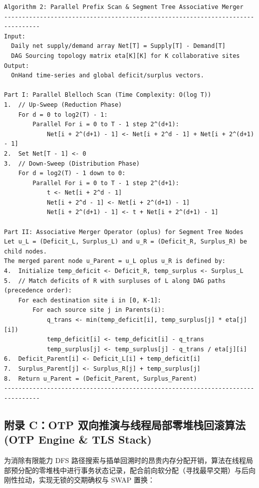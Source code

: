 \documentclass[11pt,a4paper]{article}
\begin{document}
\begin{verbatim}
Algorithm 2: Parallel Prefix Scan & Segment Tree Associative Merger
--------------------------------------------------------------------------------
Input:
  Daily net supply/demand array Net[T] = Supply[T] - Demand[T]
  DAG Sourcing topology matrix eta[K][K] for K collaborative sites
Output:
  OnHand time-series and global deficit/surplus vectors.

Part I: Parallel Blelloch Scan (Time Complexity: O(log T))
1.  // Up-Sweep (Reduction Phase)
    For d = 0 to log2(T) - 1:
        Parallel For i = 0 to T - 1 step 2^(d+1):
            Net[i + 2^(d+1) - 1] <- Net[i + 2^d - 1] + Net[i + 2^(d+1) - 1]
2.  Set Net[T - 1] <- 0
3.  // Down-Sweep (Distribution Phase)
    For d = log2(T) - 1 down to 0:
        Parallel For i = 0 to T - 1 step 2^(d+1):
            t <- Net[i + 2^d - 1]
            Net[i + 2^d - 1] <- Net[i + 2^(d+1) - 1]
            Net[i + 2^(d+1) - 1] <- t + Net[i + 2^(d+1) - 1]

Part II: Associative Merger Operator (oplus) for Segment Tree Nodes
Let u_L = (Deficit_L, Surplus_L) and u_R = (Deficit_R, Surplus_R) be child nodes.
The merged parent node u_Parent = u_L oplus u_R is defined by:
4.  Initialize temp_deficit <- Deficit_R, temp_surplus <- Surplus_L
5.  // Match deficits of R with surpluses of L along DAG paths (precedence order):
    For each destination site i in [0, K-1]:
        For each source site j in Parents(i):
            q_trans <- min(temp_deficit[i], temp_surplus[j] * eta[j][i])
            temp_deficit[i] <- temp_deficit[i] - q_trans
            temp_surplus[j] <- temp_surplus[j] - q_trans / eta[j][i]
6.  Deficit_Parent[i] <- Deficit_L[i] + temp_deficit[i]
7.  Surplus_Parent[j] <- Surplus_R[j] + temp_surplus[j]
8.  Return u_Parent = (Deficit_Parent, Surplus_Parent)
--------------------------------------------------------------------------------
\end{verbatim}

\subsection*{附录 C：OTP 双向推演与线程局部零堆栈回滚算法 (OTP Engine \& TLS Stack)}

为消除有限能力 DFS 路径搜索与插单回溯时的昂贵内存分配开销，算法在线程局部预分配的零堆栈中进行事务状态记录，配合前向软分配（寻找最早交期）与后向刚性拉动，实现无锁的交期确权与 SWAP 置换：
\end{document}
